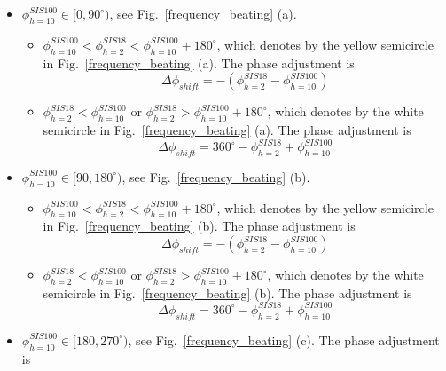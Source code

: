 \begin{itemize}
    \item $\phi_{h=10}^{SIS100}\in [0,90^\circ)$, see Fig.~\ref{frequency_beating} (a).

	\begin{itemize}
		\item $\phi_{h=10}^{SIS100}< \phi_{h=2}^{SIS18}< \phi_{h=10}^{SIS100} +180^\circ$, which denotes by the yellow semicircle in Fig.~\ref{frequency_beating} (a). The phase adjustment is
    \begin{equation}
			\Delta \phi_{shift}=-(\phi_{h=2}^{SIS18} - \phi_{h=10}^{SIS100})
    \end{equation}
    		\item $\phi_{h=2}^{SIS18} < \phi_{h=10}^{SIS100}$ or  $\phi_{h=2}^{SIS18} >\phi_{h=10}^{SIS100} +180^\circ$, which denotes by the white semicircle in Fig.~\ref{frequency_beating} (a). The phase adjustment is
    \begin{equation}
			\Delta \phi_{shift}= 360^\circ - \phi_{h=2}^{SIS18} + \phi_{h=10}^{SIS100}
    \end{equation}
	\end{itemize}
    \item  $\phi_{h=10}^{SIS100}\in [90,180^\circ)$, see Fig.~\ref{frequency_beating} (b). 

	\begin{itemize}
		\item $\phi_{h=10}^{SIS100}< \phi_{h=2}^{SIS18}< \phi_{h=10}^{SIS100} +180^\circ$, which denotes by the yellow semicircle in Fig.~\ref{frequency_beating} (b). The phase adjustment is
	    \begin{equation}		
\Delta \phi_{shift}=-(\phi_{h=2}^{SIS18} - \phi_{h=10}^{SIS100})
    \end{equation}
    		\item $\phi_{h=2}^{SIS18} < \phi_{h=10}^{SIS100}$ or  $\phi_{h=2}^{SIS18} >\phi_{h=10}^{SIS100} +180^\circ$, which denotes by the white semicircle in Fig.~\ref{frequency_beating} (b).  The phase adjustment is
    \begin{equation}			
\Delta \phi_{shift}=360^\circ - \phi_{h=2}^{SIS18} + \phi_{h=10}^{SIS100}
    \end{equation}
	\end{itemize}
    \item $\phi_{h=10}^{SIS100}\in [180,270^\circ)$, see Fig.~\ref{frequency_beating} (c). The phase adjustment is


\end{itemize}
